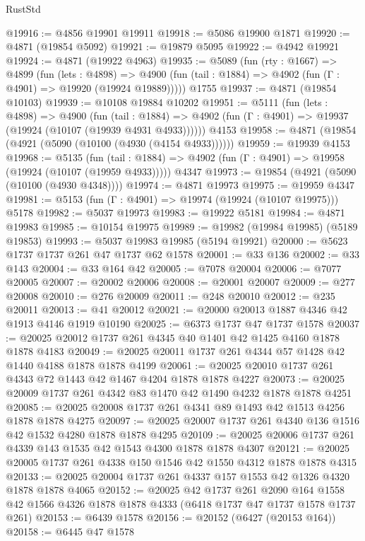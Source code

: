 \begin{lexlean}{RustStd}
\begin{coremodule}
@19916 := @4856 @19901 @19911
@19918 := @5086 @19900 @1871
@19920 := @4871 (@19854 @5092)
@19921 := @19879 @5095
@19922 := @4942 @19921
@19924 := @4871 (@19922 @4963)
@19935 := @5089
    (fun (rty : @1667) =>
    @4899
      (fun (lets : @4898) =>
      @4900 (fun (tail : @1884) => @4902 (fun (Γ : @4901) => @19920 (@19924 @19889)))))
    @1755
@19937 := @4871 (@19854 @10103)
@19939 := @10108 @19884 @10202
@19951 := @5111
    (fun (lets : @4898) =>
    @4900
      (fun (tail : @1884) =>
      @4902 (fun (Γ : @4901) => @19937 (@19924 (@10107 (@19939 @4931 @4933))))))
    @4153
@19958 := @4871 (@19854 (@4921 (@5090 (@10100 (@4930 (@4154 @4933))))))
@19959 := @19939 @4153
@19968 := @5135
    (fun (tail : @1884) => @4902 (fun (Γ : @4901) => @19958 (@19924 (@10107 (@19959 @4933)))))
    @4347
@19973 := @19854 (@4921 (@5090 (@10100 (@4930 @4348))))
@19974 := @4871 @19973
@19975 := @19959 @4347
@19981 := @5153 (fun (Γ : @4901) => @19974 (@19924 (@10107 @19975))) @5178
@19982 := @5037 @19973
@19983 := @19922 @5181
@19984 := @4871 @19983
@19985 := @10154 @19975
@19989 := @19982 (@19984 @19985) (@5189 @19853)
@19993 := @5037 @19983 @19985 (@5194 @19921)
@20000 := @5623 @1737 @1737 @261 @47 @1737 @62 @1578
@20001 := @33 @136
@20002 := @33 @143
@20004 := @33 @164 @42
@20005 := @7078 @20004
@20006 := @7077 @20005
@20007 := @20002 @20006
@20008 := @20001 @20007
@20009 := @277 @20008
@20010 := @276 @20009
@20011 := @248 @20010
@20012 := @235 @20011
@20013 := @41 @20012
@20021 := @20000 @20013 @1887 @4346 @42 @1913 @4146 @1919 @10190
@20025 := @6373 @1737 @47 @1737 @1578
@20037 := @20025 @20012 @1737 @261 @4345 @40 @1401 @42 @1425 @4160 @1878 @1878 @4183
@20049 := @20025 @20011 @1737 @261 @4344 @57 @1428 @42 @1440 @4188 @1878 @1878 @4199
@20061 := @20025 @20010 @1737 @261 @4343 @72 @1443 @42 @1467 @4204 @1878 @1878 @4227
@20073 := @20025 @20009 @1737 @261 @4342 @83 @1470 @42 @1490 @4232 @1878 @1878 @4251
@20085 := @20025 @20008 @1737 @261 @4341 @89 @1493 @42 @1513 @4256 @1878 @1878 @4275
@20097 := @20025 @20007 @1737 @261 @4340 @136 @1516 @42 @1532 @4280 @1878 @1878 @4295
@20109 := @20025 @20006 @1737 @261 @4339 @143 @1535 @42 @1543 @4300 @1878 @1878 @4307
@20121 := @20025 @20005 @1737 @261 @4338 @150 @1546 @42 @1550 @4312 @1878 @1878 @4315
@20133 := @20025 @20004 @1737 @261 @4337 @157 @1553 @42 @1326 @4320 @1878 @1878 @4065
@20152 := @20025
    @42
    @1737
    @261
    @2090
    @164
    @1558
    @42
    @1566
    @4326
    @1878
    @1878
    @4333
    (@6418 @1737 @47 @1737 @1578 @1737 @261)
@20153 := @6439 @1578
@20156 := @20152 (@6427 (@20153 @164))
@20158 := @6445 @47 @1578

\end{coremodule}
\end{lexlean}
